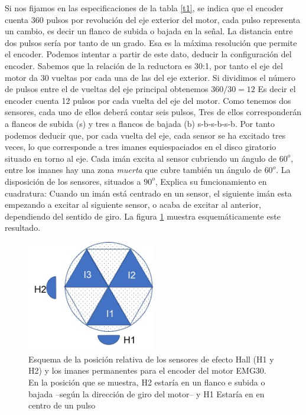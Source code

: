 \documentclass[10pt,a4paper]{report}
\begin{document}
Si nos fijamos en las especificaciones de la tabla \ref{t1}, se indica que el encoder cuenta 360 pulsos por revolución del eje exterior del motor, cada pulso representa un cambio, es decir un flanco de subida o bajada en la señal. La distancia entre dos pulsos sería por tanto de un grado. Esa es la máxima resolución que permite el encoder. Podemos intentar a partir de este dato, deducir la configuración del encoder. Sabemos que la relación de la reductora es 30:1, por tanto el eje del motor da 30 vueltas por cada una de las del eje exterior. Si dividimos el número de pulsos entre el de vueltas del eje principal obtenemos $360/30 = 12$ Es decir el encoder cuenta 12 pulsos por cada vuelta del eje del motor. Como tenemos dos sensores, cada uno de ellos deberá contar seis pulsos,  Tres de ellos corresponderán a flancos de subida (s) y tres a flancos de bajada (b) s-b-s-b-s-b. Por tanto podemos deducir que, por cada vuelta del eje, cada sensor se ha excitado tres veces, lo que corresponde a tres imanes equiespaciados en el disco giratorio situado en torno al eje. Cada imán excita al sensor cubriendo un ángulo de $60^o$, entre los imanes hay una zona \emph{muerta} que cubre también un ángulo de $60^o$. La disposición de los sensores, situados a $90^o$, Explica su funcionamiento en cuadratura: Cuando un imán está centrado en un sensor, el siguiente imán esta empezando a excitar al siguiente sensor, o acaba de excitar al anterior, dependiendo del sentido de giro. La figura \ref{f7} muestra esquemáticamente este resultado.

\begin{figure}
\centering
\includegraphics[width= 0.5\textwidth]{esqhall.jpg}
\caption{Esquema de la posición relativa de los sensores de efecto Hall (H1 y H2) y los imanes permanentes para el encoder del motor EMG30. En la posición que se muestra, H2 estaría en un flanco e subida o bajada --según la dirección de giro del motor-- y H1 Estaría en en centro de un pulso}\label{f7}
\end{figure} 
\end{document}
